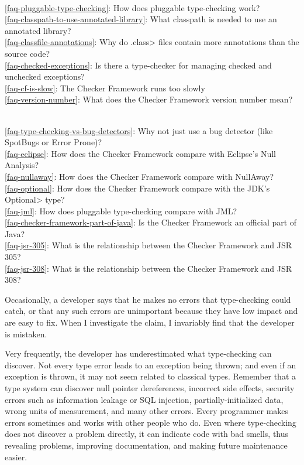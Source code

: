 \\ \ref{faq-pluggable-type-checking}: How does pluggable type-checking work?
\\ \ref{faq-classpath-to-use-annotated-library}: What classpath is needed to use an annotated library?
\\ \ref{faq-classfile-annotations}: Why do \<.class> files contain more annotations than the source code?
\\ \ref{faq-checked-exceptions}: Is there a type-checker for managing checked and unchecked exceptions?
\\ \ref{faq-cf-is-slow}: The Checker Framework runs too slowly
\\ \ref{faq-version-number}: What does the Checker Framework version number mean?

\\ \ref{faq-type-checking-vs-bug-detectors}: Why not just use a bug detector (like SpotBugs or Error Prone)?
\\ \ref{faq-eclipse}: How does the Checker Framework compare with Eclipse's Null Analysis?
\\ \ref{faq-nullaway}: How does the Checker Framework compare with NullAway?
\\ \ref{faq-optional}: How does the Checker Framework compare with the JDK's \<Optional> type?
\\ \ref{faq-jml}: How does pluggable type-checking compare with JML?
\\ \ref{faq-checker-framework-part-of-java}: Is the Checker Framework an official part of Java?
\\ \ref{faq-jsr-305}: What is the relationship between the Checker Framework and JSR 305?
\\ \ref{faq-jsr-308}: What is the relationship between the Checker Framework and JSR 308?




Occasionally, a developer says that he makes no errors that type-checking
could catch, or that any such errors are unimportant because they have low
impact and are easy to fix.  When I investigate the claim, I invariably
find that the developer is mistaken.

Very frequently, the developer has underestimated what type-checking can
discover.  Not every type error leads to an exception being thrown; and
even if an exception is thrown, it may not seem related to classical types.
Remember that a type system can discover
null pointer dereferences,
incorrect side effects,
security errors such as information leakage or SQL injection,
partially-initialized data,
wrong units of measurement,
and many other errors.
Every programmer makes errors sometimes and works with other people
who do.
Even where type-checking does not discover a
problem directly, it can indicate code with bad smells, thus revealing
problems, improving documentation, and making future maintenance easier.

